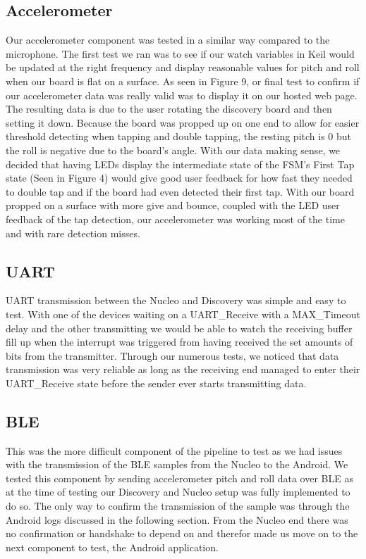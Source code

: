 \subsection{Accelerometer}
Our accelerometer component was tested in a similar way compared to the microphone. The first test we ran was to see if our watch variables in Keil would be updated at the right frequency and display reasonable values for pitch and roll when our board is flat on a surface. As seen in Figure 9, or final test to confirm if our accelerometer data was really valid was to display it on our hosted web page. The resulting data is due to the user rotating the discovery board and then setting it down. Because the board was propped up on one end to allow for easier threshold detecting when tapping and double tapping, the resting pitch is 0 but the roll is negative due to the board's angle. With our data making sense, we decided that having LEDs display the intermediate state of the FSM's First Tap state (Seen in Figure 4) would give good user feedback for how fast they needed to double tap and if the board had even detected their first tap. With our board propped on a surface with more give and bounce, coupled with the LED user feedback of the tap detection, our accelerometer was working most of the time and with rare detection misses.

\subsection{UART}
UART transmission between the Nucleo and Discovery was simple and easy to test. With one of the devices waiting on a UART\_Receive with a MAX\_Timeout delay and the other transmitting we would be able to watch the receiving buffer fill up when the interrupt was triggered from having received the set amounts of bits from the transmitter. Through our numerous tests, we noticed that data transmission was very reliable as long as the receiving end managed to enter their UART\_Receive state before the sender ever starts transmitting data. 

\subsection{BLE}
This was the more difficult component of the pipeline to test as we had issues with the transmission of the BLE samples from the Nucleo to the Android. We tested this component by sending accelerometer pitch and roll data over BLE as at the time of testing our Discovery and Nucleo setup was fully implemented to do so. The only way to confirm the transmission of the sample was through the Android logs discussed in the following section. From the Nucleo end there was no confirmation or handshake to depend on and therefor made us move on to the next component to test, the Android application.

